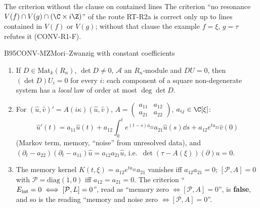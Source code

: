 \begin{falsebox}{The criterion without the clause on contained lines}{\falsest}
The criterion ``no resonance $V(f)\cap V(g)\cap(\C\times i\Z)$'' of the route RT-R2a is correct only up to lines contained in $V(f)$ or $V(g)$; without that clause the example $f=\xi$, $g=\tau$ refutes it (CONV-R1-F).
\end{falsebox}

\begin{dimcard}{B95}{CONV-MZ}{Mori--Zwanzig with constant coefficients}{\proved}{}
\begin{enumerate}[label=(MZ\arabic*)]
\item If $D\in\mathrm{Mat}_k(R_n)$, $\det D\ne0$, $\mathcal A$ an $R_n$-module and $DU=0$, then $(\det D)U_i=0$ for every $i$: each component of a square non-degenerate system has a \emph{local} law of order at most $\deg\det D$.
\item For $(\hat u,\hat v)'=A(i\kappa)(\hat u,\hat v)$, $A=\begin{pmatrix}a_{11}&a_{12}\\a_{21}&a_{22}\end{pmatrix}$, $a_{ij}\in\C[\xi]$:
\[
\hat u'(t)=a_{11}\hat u(t)+a_{12}\!\int_0^t\!e^{(t-s)a_{22}}a_{21}\hat u(s)\dd s+a_{12}e^{ta_{22}}\hat v(0)
\]
(Markov term, memory, ``noise'' from unresolved data), and $(\partial_t-a_{22})(\partial_t-a_{11})\hat u=a_{12}a_{21}\hat u$, i.e.\ $\det(\tau-A(\xi))(\partial)u=0$.
\item The memory kernel $K(t,\xi)=a_{12}e^{ta_{22}}a_{21}$ vanishes iff $a_{12}a_{21}=0$; $[\mathcal P,A]=0$ with $\mathcal P=\mathrm{diag}(1,0)$ iff $a_{12}=a_{21}=0$. The criterion ``$E_{\rm int}=0\iff[\mathcal P,L]=0$'', read as ``memory zero $\iff[\mathcal P,A]=0$'', is \textbf{false}, and so is the reading ``memory and noise zero $\iff[\mathcal P,A]=0$''.
\end{enumerate}
\end{dimcard}

